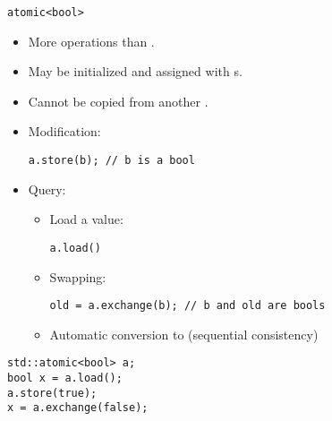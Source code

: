 \begin{frame}[t,fragile]{\texttt{atomic<bool>}}
\begin{itemize}
  \item More operations than .
    \item May be initialized and assigned with s.
    \item Cannot be copied from another .
    \item Modification: 
\begin{lstlisting}
a.store(b); // b is a bool
\end{lstlisting}
    \item Query:
      \begin{itemize}
        \item Load a value:
\begin{lstlisting}
a.load()
\end{lstlisting}
        \item Swapping:
\begin{lstlisting}
old = a.exchange(b); // b and old are bools
\end{lstlisting}
        \item Automatic conversion to  (sequential consistency)
      \end{itemize}
\end{itemize}
\begin{lstlisting}
std::atomic<bool> a;
bool x = a.load();
a.store(true);
x = a.exchange(false);
\end{lstlisting}
\end{frame}

